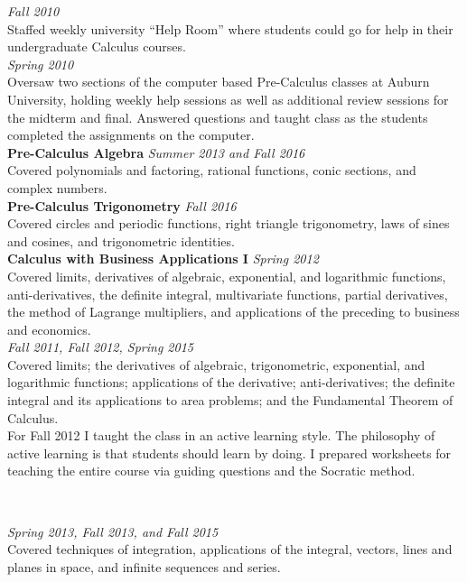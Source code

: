 \documentclass{article}
\begin{document}
 \hfill {\it Fall 2010\/} \\
Staffed weekly university ``Help Room'' where students could go for help in
their undergraduate Calculus courses. \\ 

 \hfill {\it Spring 2010} \\
Oversaw two sections of the computer based Pre-Calculus classes at Auburn
University, holding weekly help sessions as well as additional review sessions
for the midterm and final.  Answered questions and taught class as the
students completed the assignments on the computer. \\

\noindent \textbf{Pre-Calculus Algebra} \hfill \textit{Summer 2013 and Fall 2016}\\
Covered polynomials and factoring, rational functions, conic sections, and
complex numbers.
\\

\noindent \textbf{Pre-Calculus Trigonometry} \hfill \textit{Fall 2016} \\
Covered circles and periodic functions, right triangle trigonometry, laws of
sines and cosines, and trigonometric identities.\\

\noindent\textbf{Calculus with Business Applications I} \hfill \textit{Spring 2012}\\
Covered limits, derivatives of algebraic, exponential, and logarithmic
functions, anti-derivatives, the definite integral, multivariate functions,
partial derivatives, the method of Lagrange multipliers, and applications of the
preceding to business and economics.
\\

 \hfill {\it Fall 2011, Fall 2012, Spring 2015}\\
Covered limits; the derivatives of algebraic, trigonometric, exponential, and
logarithmic functions; applications of the derivative; anti-derivatives; the
definite integral and its applications to area problems; and the Fundamental
Theorem of Calculus. \\ For Fall 2012 I taught the class in an active learning
style. The philosophy of active learning is that students should learn by
doing. I prepared worksheets for teaching the entire course via guiding
questions and the Socratic method.

\

 \hfill {\it Spring 2013, Fall 2013, and Fall 2015}\\
Covered techniques of integration, applications of the
integral, vectors, lines and planes in space, and infinite sequences
and series.  
\end{document}
